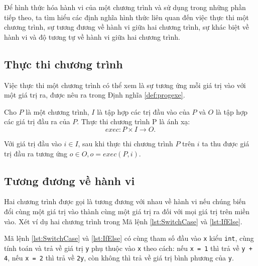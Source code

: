 Để hình thức hóa hành vi của một chương trình và sử dụng trong những
phần tiếp theo, ta tìm hiểu các định nghĩa hình thức liên quan đến
việc thực thi một chương trình, sự tương đương về hành vi giữa hai
chương trình, sự khác biệt về hành vi và độ tương tự về hành vi giữa
hai chương trình.
        
\subsection{Thực thi chương trình}

Việc thực thi một chương trình có thể xem là sự tương ứng mỗi giá trị vào với một giá trị ra, được nêu ra trong Định nghĩa \ref{def:progexe}.

\begin{definition}
  \label{def:progexe}
  Cho $P$ là một chương trình, $I$ là tập hợp các trị đầu vào của $P$
  và $O$ là tập hợp các giá trị đầu ra của $P$. Thực thi chương trình
  P là ánh xạ:
  \[exec: P \times I \rightarrow O.
  \]
\end{definition}

Với giá trị đầu vào $i \in I$, sau khi thực thi chương trình $P$ trên
$i$ ta thu được giá trị đầu ra tương ứng $o \in O, o = exec(P, i)$.

\subsection{Tương đương về hành vi}

Hai chương trình được gọi là tương đương với nhau về hành vi nếu chúng
biến đổi cùng một giá trị vào thành cùng một giá trị ra đối với mọi
giá trị trên miền vào. Xét ví dụ hai chương trình trong Mã lệnh
\ref{lst:SwitchCase} và \ref{lst:IfElse}.

\begin{minipage}[t]{0.45\linewidth}
  
\end{minipage}%
\hfill\vrule\hfill
\begin{minipage}[t]{0.45\linewidth}
  
\end{minipage}%

Mã lệnh \ref{lst:SwitchCase} và \ref{lst:IfElse} có cùng tham số đầu vào
\texttt{x} kiểu \texttt{int}, cùng tính toán và trả về giá trị
\texttt{y} phụ thuộc vào \texttt{x} theo cách: nếu \texttt{x = 1} thì
trả về \texttt{y + 4}, nếu \texttt{x = 2} thì trả về \texttt{2y}, còn
không thì trả về giá trị bình phương của \texttt{y}.


